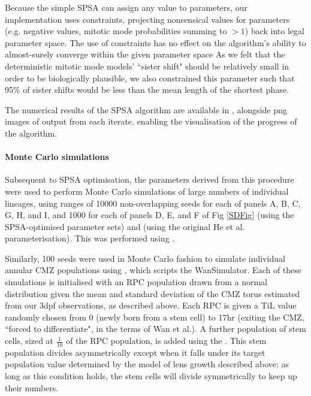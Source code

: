  Because the simple SPSA can assign any value to parameters, our implementation uses constraints, projecting nonsensical values for parameters (e.g. negative values, mitotic mode probabilities summing to $>1$) back into legal parameter space. The use of constraints has no effect on the algorithm's ability to almost-surely converge within the given parameter space\cite{Sadegh1997} As we felt that the deterministic mitotic mode models' ``sister shift" should be relatively small in order to be biologically plausible, we also constrained this parameter such that 95\% of sister shifts would be less than the mean length of the shortest phase.
 
 The numerical results of the SPSA algorithm are available in , alongside png images of output from each iterate, enabling the visualisation of the progress of the algorithm.
 
\paragraph{Monte Carlo simulations}
 Subsequent to SPSA optimisation, the parameters derived from this procedure were used to perform Monte Carlo simulations of large numbers of individual lineages, using ranges of 10000 non-overlapping seeds for each of panels A, B, C, G, H, and I, and 1000 for each of panels D, E, and F of Fig \ref{SDFig} (using the SPSA-optimised parameter sets) and  (using the original He et al. parameterisation). This was performed using .
 
 Similarly, 100 seeds were used in Monte Carlo fashion to simulate individual annular CMZ populations using , which scripts the WanSimulator. Each of these simulations is initialised with an RPC population drawn from a normal distribution given the mean and standard deviation of the CMZ torus estimated from our 3dpf observations, as described above. Each RPC is given a TiL value randomly chosen from 0 (newly born from a stem cell) to 17hr (exiting the CMZ, ``forced to differentiate", in the terms of Wan et al.). A further population of stem cells, sized at $\frac{1}{10}$ of the RPC population, is added using the . This stem population divides asymmetrically except when it falls under its target population value determined by the model of lens growth described above; as long as this condition holds, the stem cells will divide symmetrically to keep up their numbers.
 
